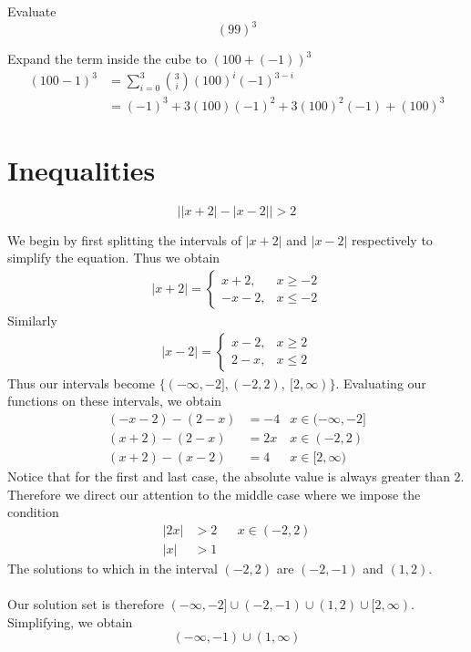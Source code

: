 \documentclass[a4paper]{article}
\begin{document}
\begin{question}{}{}
Evaluate
\[
(99)^3
\]
\end{question}
Expand the term inside the cube to \((100+(-1))^3\)
\begin{align*}
(100-1)^3 &= \sum_{i=0}^3 {3 \choose i} (100)^i(-1)^{3-i} \\
&= (-1)^{3} + 3(100)(-1)^2 + 3(100)^2(-1) + (100)^3
\end{align*}

\section{Inequalities}
\begin{question}{}{}
\[
\left| |x+2|-|x-2| \right| > 2
\]
\end{question}
We begin by first splitting the intervals of \(|x+2|\) and \(|x-2|\) respectively to simplify the equation. Thus we obtain
\begin{align*}
|x+2| = 
\begin{cases}
    x+2, &x \geq -2 \\
    -x-2, &x \leq -2
\end{cases}
\end{align*}
Similarly
\begin{align*}
|x-2| = 
\begin{cases}
    x-2, &x \geq 2 \\
    2-x, &x \leq 2
\end{cases}
\end{align*}
Thus our intervals become \(\{(-\infty, -2], (-2, 2), \ [2, \infty)\} \).
Evaluating our functions on these intervals, we obtain
\begin{align*}
(-x-2) - (2-x) &= -4 & x \in (-\infty, -2] \\
(x+2) - (2-x) &= 2x & x \in (-2, 2) \\
(x+2) - (x-2) &= 4 & x \in [2, \infty)
\end{align*}
Notice that for the first and last case, the absolute value is always greater than 2. Therefore we direct our attention to the middle case where we impose the condition
\begin{align*}
|2x| &> 2 && x \in (-2, 2) \\
|x| &>  1
\end{align*}
The solutions to which in the interval \((-2, 2)\) are \((-2, -1)\) and \((1, 2)\).
\\ \\
Our solution set is therefore \((-\infty, -2] \cup (-2, -1) \cup (1, 2) \cup [2, \infty)\). Simplifying, we obtain
\[
(-\infty, -1) \cup (1, \infty)
\]
\end{document}
